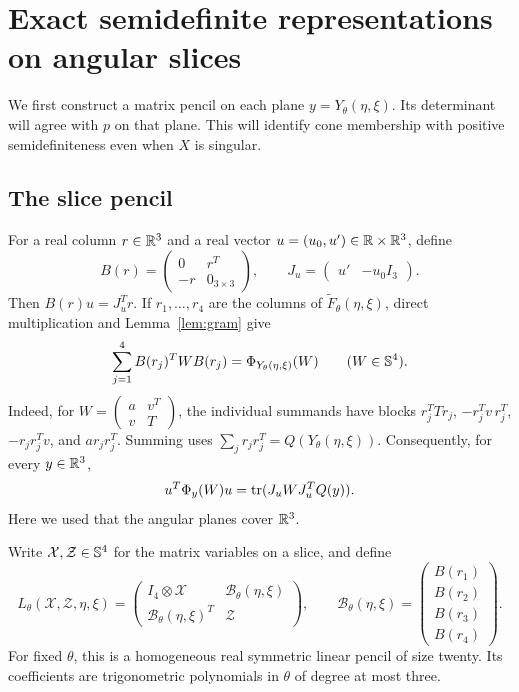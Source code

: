\section{Exact semidefinite representations on angular slices}
\label{sec:slices}

We first construct a matrix pencil on each plane $y=Y_\theta(\eta,\xi)$.
Its determinant will agree with $p$ on that plane. This will identify
cone membership with positive semidefiniteness even when $X$ is singular.



\subsection{The slice pencil}
For a real column $r\in\mathbb R^3$ and a real vector
$u=(u_0,u')\in\mathbb R\times\mathbb R^3$, define
\begin{equation}\label{eq:BJ}
 B(r)=\begin{pmatrix}0&r^T\\-r&0_{3\times3}\end{pmatrix},
 \qquad J_u=\begin{pmatrix}u'&-u_0I_3\end{pmatrix}.
\end{equation}
Then $B(r)u=J_u^Tr$. If $r_1,\ldots,r_4$ are the columns of
$\widetilde F_\theta(\eta,\xi)$, direct multiplication and
Lemma~\ref{lem:gram} give
\begin{equation}\label{eq:Phi-factor}
 \sum_{j=1}^4 B(r_j)^TWB(r_j)
       =\Phi_{Y_\theta(\eta,\xi)}(W)
       \qquad(W\in\mathbb S^4).
\end{equation}
Indeed, for $W=\left(\begin{smallmatrix}a&v^T\\v&T\end{smallmatrix}\right)$,
the individual summands have blocks
$r_j^TTr_j$, $-r_j^Tv\,r_j^T$, $-r_jr_j^Tv$, and $a r_jr_j^T$.
Summing uses $\sum_jr_jr_j^T=Q(Y_\theta(\eta,\xi))$.
Consequently, for every $y\in\mathbb R^3$,
\begin{equation}\label{eq:Phi-quadratic}
 u^T\Phi_y(W)u=\operatorname{tr}(J_uWJ_u^TQ(y)).
\end{equation}
Here we used that the angular planes cover $\mathbb R^3$.

Write $\mathcal X,\mathcal Z\in\mathbb S^4$ for the matrix variables on a
slice, and define
\begin{equation}\label{eq:slice-pencil}
 L_\theta(\mathcal X,\mathcal Z,\eta,\xi)
 =\begin{pmatrix}
 I_4\otimes\mathcal X&\mathcal B_\theta(\eta,\xi)\\
 \mathcal B_\theta(\eta,\xi)^T&\mathcal Z
 \end{pmatrix},
 \qquad
 \mathcal B_\theta(\eta,\xi)=
 \begin{pmatrix}B(r_1)\\B(r_2)\\B(r_3)\\B(r_4)\end{pmatrix}.
\end{equation}
For fixed $\theta$, this is a homogeneous real symmetric linear pencil
of size twenty. Its coefficients are trigonometric polynomials in
$\theta$ of degree at most three.

